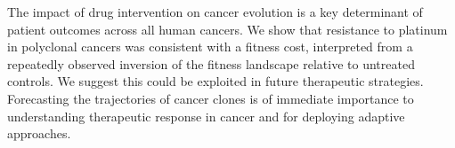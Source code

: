 



The impact of drug intervention on cancer evolution is a key determinant of patient outcomes across all human cancers.  
We show that resistance to platinum in polyclonal cancers was consistent with a fitness cost, interpreted from a repeatedly observed inversion of the fitness landscape relative to untreated controls. We suggest this could be exploited in future therapeutic strategies. Forecasting the trajectories of cancer clones is of immediate importance to understanding therapeutic response in cancer and for deploying adaptive approaches\cite{Vasan2019-mt}.

